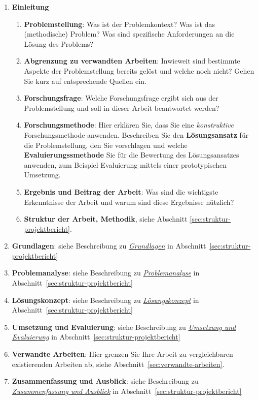 \begin{enumerate}
    \item \textbf{Einleitung}
    \begin{enumerate}
        \item \textbf{Problemstellung}: Was ist der Problemkontext? Was ist das (methodische) Problem? Was sind spezifische Anforderungen an die Lösung des Problems?
        \item \textbf{Abgrenzung zu verwandten Arbeiten}: Inwieweit sind bestimmte Aspekte der Problemstellung bereits gelöst und welche noch nicht? Gehen Sie kurz auf entsprechende Quellen ein.
        \item \textbf{Forschungsfrage}: Welche Forschungsfrage ergibt sich aus der Problemstellung und soll in dieser Arbeit beantwortet werden?
        \item \textbf{Forschungsmethode}: Hier erklären Sie, dass Sie eine \textit{konstruktive} Forschungsmethode anwenden. Beschreiben Sie den \textbf{Lösungsansatz} für die Problemstellung, den Sie vorschlagen und welche \textbf{Evaluierungssmethode} Sie für die Bewertung des Lösungsansatzes anwenden, zum Beispiel Evaluierung mittels einer prototypischen Umsetzung.
        \item \textbf{Ergebnis und Beitrag der Arbeit}: Was sind die wichtigste Erkenntnisse der Arbeit und warum sind diese Ergebnisse nützlich?
        \item {\bf Struktur der Arbeit, Methodik}, siehe Abschnitt \ref{sec:struktur-projektbericht}.
    \end{enumerate}
    \item \textbf{Grundlagen}: siehe Beschreibung zu \hyperref[struktur:grundlagen]{\textit{Grundlagen}}  in Abschnitt~\ref{sec:struktur-projektbericht}
    \item \textbf{Problemanalyse}: siehe Beschreibung zu \hyperref[struktur:problemanalyse]{\textit{Problemanalyse}}  in Abschnitt~\ref{sec:struktur-projektbericht}
    \item \textbf{Lösungskonzept}: siehe Beschreibung zu \hyperref[struktur:loesungskonzept]{\textit{Lösungskonzept}}  in Abschnitt~\ref{sec:struktur-projektbericht}
    \item \textbf{Umsetzung und Evaluierung}: siehe Beschreibung zu \hyperref[struktur:umsetzung-und-evaluierung]{\textit{Umsetzung und Evaluierung}}  in Abschnitt~\ref{sec:struktur-projektbericht}
    \item \textbf{Verwandte Arbeiten}: Hier grenzen Sie Ihre Arbeit zu vergleichbaren existierenden Arbeiten ab, siehe Abschnitt~\ref{sec:verwandte-arbeiten}.
    \item \textbf{Zusammenfassung und Ausblick}:
    siehe Beschreibung zu \hyperref[struktur:zusammenfassung-ausblick]{\textit{Zusammenfassung und Ausblick}}  in Abschnitt~\ref{sec:struktur-projektbericht}
\end{enumerate}


